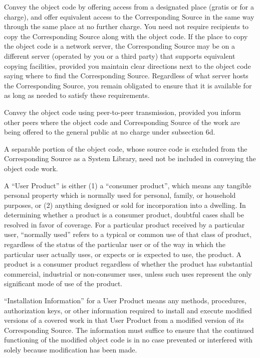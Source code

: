  \item Convey the object code by offering access from a designated place (gratis or for a charge), and offer equivalent access to the Corresponding Source in the same way through the same place at no further charge.  You need not require recipients to copy the Corresponding Source along with the object code.  If the place to copy the object code is a network server, the Corresponding Source may be on a different server (operated by you or a third party) that supports equivalent copying facilities, provided you maintain clear directions next to the object code saying where to find the Corresponding Source.  Regardless of what server hosts the Corresponding Source, you remain obligated to ensure that it is available for as long as needed to satisfy these requirements.

  \item Convey the object code using peer-to-peer transmission, provided you inform other peers where the object code and Corresponding Source of the work are being offered to the general public at no charge under subsection 6d.
  \stopitemize

A separable portion of the object code, whose source code is excluded from the Corresponding Source as a System Library, need not be included in conveying the object code work.

A ``User Product'' is either (1) a ``consumer product'', which means any tangible personal property which is normally used for personal, family, or household purposes, or (2) anything designed or sold for incorporation into a dwelling.  In determining whether a product is a consumer product, doubtful cases shall be resolved in favor of coverage.  For a particular product received by a particular user, ``normally used'' refers to a typical or common use of that class of product, regardless of the status of the particular user or of the way in which the particular user actually uses, or expects or is expected to use, the product.  A product is a consumer product regardless of whether the product has substantial commercial, industrial or non-consumer uses, unless such uses represent the only significant mode of use of the product.

``Installation Information'' for a User Product means any methods, procedures, authorization keys, or other information required to install and execute modified versions of a covered work in that User Product from a modified version of its Corresponding Source.  The information must suffice to ensure that the continued functioning of the modified object code is in no case prevented or interfered with solely because modification has been made.

